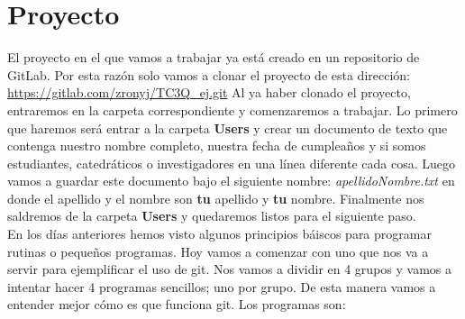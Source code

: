 \documentclass[10pt,letterpaper]{article}
\begin{document}
\section{Proyecto}
El proyecto en el que vamos a trabajar ya est\'a creado en un repositorio de GitLab. Por esta raz\'on solo vamos a clonar el proyecto de esta direcci\'on: \href{https://gitlab.com/zronyj/TC3Q\_ej.git}{https://gitlab.com/zronyj/TC3Q\_ej.git} Al ya haber clonado el proyecto, entraremos en la carpeta correspondiente y comenzaremos a trabajar. Lo primero que haremos ser\'a entrar a la carpeta \textbf{Users} y crear un documento de texto que contenga nuestro nombre completo, nuestra fecha de cumplea\~nos y si somos estudiantes, catedr\'aticos o investigadores en una l\'inea diferente cada cosa. Luego vamos a guardar este documento bajo el siguiente nombre: \emph{apellidoNombre.txt} en donde el apellido y el nombre son \textbf{tu} apellido y \textbf{tu} nombre. Finalmente nos saldremos de la carpeta \textbf{Users} y quedaremos listos para el siguiente paso.\\

En los d\'ias anteriores hemos visto algunos principios b\'aiscos para programar rutinas o peque\~nos programas. Hoy vamos a comenzar con uno que nos va a servir para ejemplificar el uso de git. Nos vamos a dividir en 4 grupos y vamos a intentar hacer 4 programas sencillos; uno por grupo. De esta manera vamos a entender mejor c\'omo es que funciona git. Los programas son:
\end{document}
